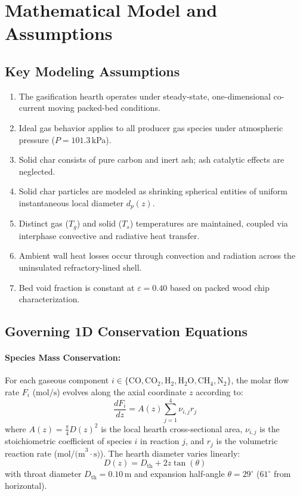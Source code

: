 \documentclass[11pt,a4paper]{article}
\begin{document}
\section{Mathematical Model and Assumptions}
\subsection{Key Modeling Assumptions}
\begin{enumerate}[leftmargin=1.5em]
    \item The gasification hearth operates under steady-state, one-dimensional co-current moving packed-bed conditions.
    \item Ideal gas behavior applies to all producer gas species under atmospheric pressure ($P = 101.3$\,kPa).
    \item Solid char consists of pure carbon and inert ash; ash catalytic effects are neglected.
    \item Solid char particles are modeled as shrinking spherical entities of uniform instantaneous local diameter $d_p(z)$.
    \item Distinct gas ($T_g$) and solid ($T_s$) temperatures are maintained, coupled via interphase convective and radiative heat transfer.
    \item Ambient wall heat losses occur through convection and radiation across the uninsulated refractory-lined shell.
    \item Bed void fraction is constant at $\varepsilon = 0.40$ based on packed wood chip characterization.
\end{enumerate}

\subsection{Governing 1D Conservation Equations}
\paragraph{Species Mass Conservation:}
For each gaseous component $i \in \{\text{CO}, \text{CO}_2, \text{H}_2, \text{H}_2\text{O}, \text{CH}_4, \text{N}_2\}$, the molar flow rate $F_i$ ($\text{mol/s}$) evolves along the axial coordinate $z$ according to:
\begin{equation}
    \frac{d F_i}{dz} = A(z) \sum_{j=1}^{4} \nu_{i,j} r_j
    \label{eq:species_mass}
\end{equation}
where $A(z) = \frac{\pi}{4} D(z)^2$ is the local hearth cross-sectional area, $\nu_{i,j}$ is the stoichiometric coefficient of species $i$ in reaction $j$, and $r_j$ is the volumetric reaction rate ($\text{mol/(m}^3\cdot\text{s)}$). The hearth diameter varies linearly:
\begin{equation}
    D(z) = D_{\text{th}} + 2 z \tan(\theta)
\end{equation}
with throat diameter $D_{\text{th}} = 0.10$\,m and expansion half-angle $\theta = 29^\circ$ ($61^\circ$ from horizontal).
\end{document}
